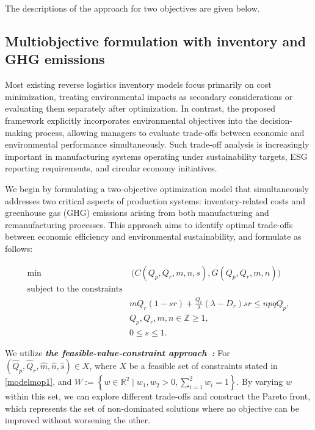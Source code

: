\documentclass[11pt]{article}
\newcommand{\ds}{\displaystyle}
\begin{document}
\noindent The descriptions of the approach for two objectives are given below.

\subsection{Multiobjective formulation with inventory and GHG emissions}
\noindent 
Most existing reverse logistics inventory models focus primarily on cost minimization, treating environmental impacts as secondary considerations or evaluating them separately after optimization. In contrast, the proposed framework explicitly incorporates environmental objectives into the decision-making process, allowing managers to evaluate trade-offs between economic and environmental performance simultaneously. Such trade-off analysis is increasingly important in manufacturing systems operating under sustainability targets, ESG reporting requirements, and circular economy initiatives.

\noindent We begin by formulating a two-objective optimization model that simultaneously addresses two critical aspects of production systems: inventory-related costs and greenhouse gas (GHG) emissions arising from both manufacturing and remanufacturing processes. This approach aims to identify optimal trade-offs between economic efficiency and environmental sustainability, and formulate as follows:

\begin{equation}\label{modelmop1}
\begin{array}{rl} 
\min & \ \bigg ( C(Q_p, Q_r, m, n, s), G(Q_p, Q_r, m, n) \bigg )\\
\mbox{subject to the constraints} \\
& \ds mQ_r(1 - sr) + \frac{Q_r}{\lambda} (\lambda - D_r)sr \leq  npqQ_p, \\ 
&\ds Q_p, Q_r, m, n \in {\mathbb{Z} \geq 1},\\
& \ds 0 \leq s \leq 1.
\end{array}
\end{equation}


\noindent We utilize \textbf{\em the feasible-value-constraint approach \em\,:} For $(\hat{Q}_p,\hat{Q}_r,\hat{m},\hat{n},\hat{s}) \in X$, where $X$ be a feasible set of constraints stated in \eqref{modelmop1}, and
\(\ds W := \left
\{ w \in \mathbb{R}^{2} \mid w_1, w_2 > 0,\sum_{i=1}^{2} w_i=1
\right \}.\)
\noindent By varying $w$ within this set, we can explore different trade-offs and construct the Pareto front, which represents the set of non-dominated solutions where no objective can be improved without worsening the other.
\end{document}
